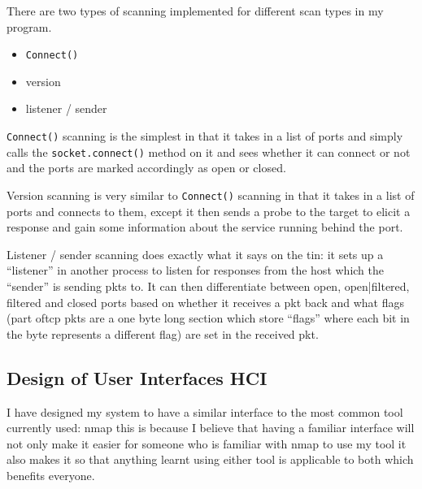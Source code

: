 \documentclass[titlepage]{article}
\let\Oldsubsection\subsection{}
\renewcommand{\subsection}{\FloatBarrier\Oldsubsection}
\begin{document}
There are two types of scanning implemented for different scan types in my program.
\begin{itemize}
  \item{\verb|Connect()|}
  \item{version}
  \item{listener / sender}
\end{itemize}
\verb|Connect()| scanning is the simplest in that it takes in a list of \glspl{port} and simply calls the
\verb|socket.connect()| method on it and sees whether it can connect or not and the \glspl{port} are
marked accordingly as open or closed.

Version scanning is very similar to \verb|Connect()| scanning in that it takes in a list of \glspl{port}
and connects to them, except it then sends a probe to the target to elicit a response and gain
some information about the \gls{service} running behind the \gls{port}.

Listener / sender scanning does exactly what it says on the tin: it sets up a ``listener'' in another process
to listen for responses from the host which the ``sender'' is sending \glspl{pkt} to. It can then differentiate
between open, open|filtered, filtered and closed \glspl{port} based on whether it receives a \gls{pkt} back
and what flags (part of\gls{tcp} \glspl{pkt} are a one byte long section which store ``flags'' where each bit in the
byte represents a different flag) are set in the received \gls{pkt}.

\subsection{Design of User Interfaces HCI}

I have designed my system to have a similar interface to the most common tool currently used: nmap
this is because I believe that having a familiar interface will not only make it easier for someone who
is familiar with nmap to use my tool it also makes it so that anything learnt using either tool is applicable
to both which benefits everyone.
\end{document}
